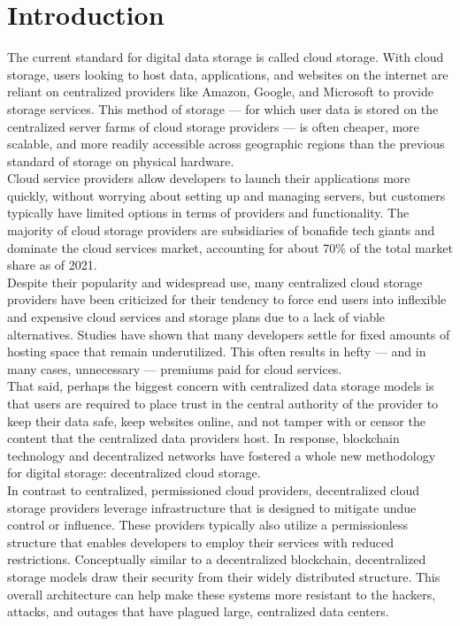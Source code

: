 \section{Introduction}

The current standard for digital data storage is called cloud storage. With cloud storage, users looking to host data, applications, and websites on the internet are reliant on centralized providers like Amazon, Google, and Microsoft to provide storage services. This method of storage — for which user data is stored on the centralized server farms of cloud storage providers — is often cheaper, more scalable, and more readily accessible across geographic regions than the previous standard of storage on physical hardware. \\[-8pt]

Cloud service providers allow developers to launch their applications more quickly, without worrying about setting up and managing servers, but customers typically have limited options in terms of providers and functionality. The majority of cloud storage providers are subsidiaries of bonafide tech giants and dominate the cloud services market, accounting for about 70\% of the total market share as of 2021. \\[-8pt]

Despite their popularity and widespread use, many centralized cloud storage providers have been criticized for their tendency to force end users into inflexible and expensive cloud services and storage plans due to a lack of viable alternatives. Studies have shown that many developers settle for fixed amounts of hosting space that remain underutilized. This often results in hefty — and in many cases, unnecessary — premiums paid for cloud services. \\[-8pt]

That said, perhaps the biggest concern with centralized data storage models is that users are required to place trust in the central authority of the provider to keep their data safe, keep websites online, and not tamper with or censor the content that the centralized data providers host. In response, blockchain technology and decentralized networks have fostered a whole new methodology for digital storage: decentralized cloud storage. \\[-8pt]

In contrast to centralized, permissioned cloud providers, decentralized cloud storage providers leverage infrastructure that is designed to mitigate undue control or influence. These providers typically also utilize a permissionless structure that enables developers to employ their services with reduced restrictions. Conceptually similar to a decentralized blockchain, decentralized storage models draw their security from their widely distributed structure. This overall architecture can help make these systems more resistant to the hackers, attacks, and outages that have plagued large, centralized data centers. \\[-8pt]